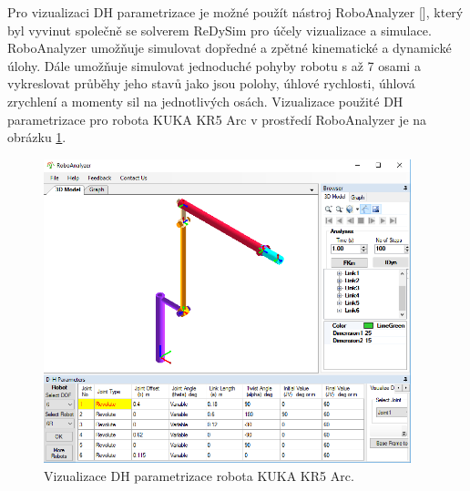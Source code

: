 Pro vizualizaci DH parametrizace je možné použít nástroj RoboAnalyzer [\cite{roboanalyzer}], který byl vyvinut společně se solverem ReDySim pro účely vizualizace a simulace. RoboAnalyzer umožňuje simulovat dopředné a zpětné kinematické a dynamické úlohy. Dále umožňuje simulovat jednoduché pohyby robotu s až 7 osami a vykreslovat průběhy jeho stavů jako jsou polohy, úhlové rychlosti, úhlová zrychlení a momenty sil na jednotlivých osách. Vizualizace použité DH parametrizace pro robota KUKA KR5 Arc v prostředí RoboAnalyzer je na obrázku \ref{dh_kuka_pic}.
\\
\begin{figure}[ht]
\includegraphics[width=0.95\textwidth]{pic_dh_kuka}
\caption{Vizualizace DH parametrizace robota KUKA KR5 Arc.}
\label{dh_kuka_pic}
\end{figure}

